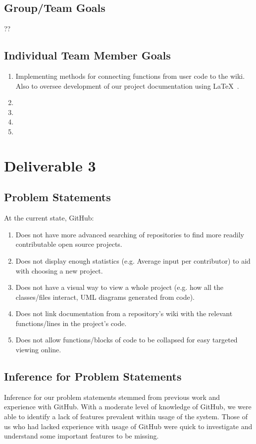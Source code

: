 \documentclass[12pt]{article}
\begin{document}
\subsection{Group/Team Goals}
??
\subsection{Individual Team Member Goals}
\begin{enumerate}
\item Implementing methods for connecting functions from user code to the wiki. Also to oversee development of our project documentation using \LaTeX\ .
\item 
\item 
\item 
\item 
\end{enumerate}

\setcounter{section}{3}
\setcounter{subsection}{0}
\section*{Deliverable 3}
\subsection{Problem Statements}
At the current state, GitHub:
\begin{enumerate}
\item  Does not have more advanced searching of repositories to find more readily contributable open source projects.
\item Does not display enough statistics (e.g. Average input per contributor) to aid with choosing a new project.
\item Does not  have a visual way to view a whole project (e.g. how all the classes/files interact, UML diagrams generated from code).
\item Does not link documentation from a repository's wiki with the relevant functions/lines in the project's code.
\item Does not allow functions/blocks of code to be collapsed for easy targeted viewing online.
\end{enumerate}

\subsection{Inference for Problem Statements}
Inference for our problem statements stemmed from previous work and experience with \textsf{GitHub}. With a moderate level of knowledge of \textsf{GitHub}, we were able to identify a lack of features prevalent within usage of the system. Those of us who had lacked experience with usage of \textsf{GitHub} were quick to investigate and understand some important features to be missing.
\end{document}
